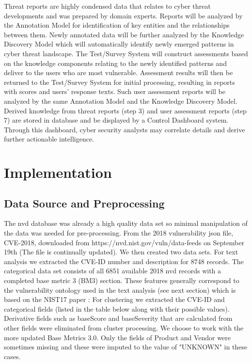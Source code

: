 \documentclass{article} %
\begin{document}
Threat reports are highly condensed data that relates to cyber threat developments and was prepared by domain experts. Reports will be analyzed by the Annotation Model for identification of key entities and the relationships between them. Newly annotated data will be further analyzed by the Knowledge Discovery Model which will automatically identify newly emerged patterns in cyber threat landscape. The Test/Survey System will construct assessments based on the knowledge components relating to the newly identified patterns and deliver to the users who are most vulnerable. Assessment results will then be returned to the Test/Survey System for initial processing, resulting in reports with scores and users' response texts. Such user assessment reports will be analyzed by the same Annotation Model and the Knowledge Discovery Model. Derived knowledge from threat reports (step 3) and user assessment reports (step 7) are stored in database and be displayed by a Control Dashboard system. Through this dashboard, cyber security analysts may correlate details and derive further actionable intelligence.

\section{Implementation}
\subsection{Data Source and Preprocessing}
The nvd database was already a high quality data set so minimal manipulation of the data was needed for pre-processing. From the 2018 vulnerability json file, CVE-2018, downloaded from https://nvd.nist.gov/vuln/data-feeds on September 19th (The file is continually updated).  We then created two data sets.  For text analysis we extracted the CVE-ID number and description for 8748 records.  The categorical data set consists of all 6851 available 2018 nvd records with a completed base metric 3 (BM3) section.  These features generally correspond to the vulnerability ontology used in the text analysis (see next section) which is based on the NIST17 paper \cite{}: For clustering we extracted the CVE-ID and categorical fields (listed in the table below along with their possible values).  Derivative fields such as baseScore and baseSeverity that are calculated from other fields were eliminated from cluster processing.  We choose to work with the more updated Base Metrics 3.0.   Only the fields of Product and Vendor were sometimes missing and these were imputed to the value of "UNKNOWN" in these cases.  
\end{document}
